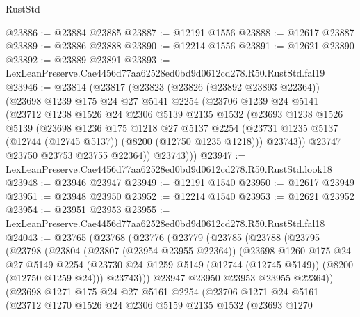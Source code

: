 \begin{lexlean}{RustStd}
\begin{coremodule}
@23886 := @23884 @23885
@23887 := @12191 @1556
@23888 := @12617 @23887
@23889 := @23886 @23888
@23890 := @12214 @1556
@23891 := @12621 @23890
@23892 := @23889 @23891
@23893 := LexLeanPreserve.Cae4456d77aa62528ed0bd9d0612cd278.R50.RustStd.fal19
@23946 := @23814
    (@23817
      (@23823
        (@23826 (@23892 @23893 @22364))
        (@23698
          @1239
          @175
          @24
          @27
          @5141
          @2254
          (@23706
            @1239
            @24
            @5141
            (@23712
              @1238
              @1526
              @24
              @2306
              @5139
              @2135
              @1532
              (@23693
                @1238
                @1526
                @5139
                (@23698
                  @1236
                  @175
                  @1218
                  @27
                  @5137
                  @2254
                  (@23731 @1235 @5137 (@12744 (@12745 @5137)) (@8200 (@12750 @1235 @1218)))
                  @23743))
              @23747
              @23750
              @23753
              @23755
              @22364))
          @23743)))
@23947 := LexLeanPreserve.Cae4456d77aa62528ed0bd9d0612cd278.R50.RustStd.look18
@23948 := @23946 @23947
@23949 := @12191 @1540
@23950 := @12617 @23949
@23951 := @23948 @23950
@23952 := @12214 @1540
@23953 := @12621 @23952
@23954 := @23951 @23953
@23955 := LexLeanPreserve.Cae4456d77aa62528ed0bd9d0612cd278.R50.RustStd.fal18
@24043 := @23765
    (@23768
      (@23776
        (@23779
          (@23785
            (@23788
              (@23795
                (@23798
                  (@23804
                    (@23807 (@23954 @23955 @22364))
                    (@23698
                      @1260
                      @175
                      @24
                      @27
                      @5149
                      @2254
                      (@23730 @24 @1259 @5149 (@12744 (@12745 @5149)) (@8200 (@12750 @1259 @24)))
                      @23743)))
                @23947
                @23950
                @23953
                @23955
                @22364))
            (@23698
              @1271
              @175
              @24
              @27
              @5161
              @2254
              (@23706
                @1271
                @24
                @5161
                (@23712
                  @1270
                  @1526
                  @24
                  @2306
                  @5159
                  @2135
                  @1532
                  (@23693
                    @1270

\end{coremodule}
\end{lexlean}
